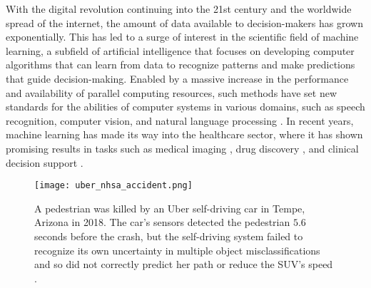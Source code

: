 With the digital revolution continuing into the 21st century and the worldwide spread of the internet, the amount of data available to decision-makers has grown exponentially. 
This has led to a surge of interest in the scientific field of machine learning, a subfield of artificial intelligence that focuses on developing computer algorithms that can learn from data to recognize patterns and make predictions that guide decision-making. 
Enabled by a massive increase in the performance and availability of parallel computing resources, such methods have set new standards for the abilities of computer systems in various domains, such as speech recognition, computer vision, and natural language processing \parencite{lecun_deep_2015}. 
In recent years, machine learning has made its way into the healthcare sector, where it has shown promising results in tasks such as medical imaging \parencite{lundervold_overview_2019}, drug discovery \parencite{chen_rise_2018}, and clinical decision support \parencite{cite15, cite14}. 

\begin{figure}
    \centering
    \texttt{[image: uber\_nhsa\_accident.png]}
    \caption[A pedestrian was killed by an Uber self-driving car in Tempe, Arizona in 2018.]{ A pedestrian was killed by an Uber self-driving car in Tempe, Arizona in 2018. The car's sensors detected the pedestrian $5.6$ seconds before the crash, but the self-driving system failed to recognize its own uncertainty in multiple object misclassifications and so did not correctly predict her path or reduce the SUV's speed \parencite[photo credit][]{nationaltransportationsafetyboardnhsa_collision_2019}.}
    \label{fig:uber_nhsa_accident}
\end{figure}

